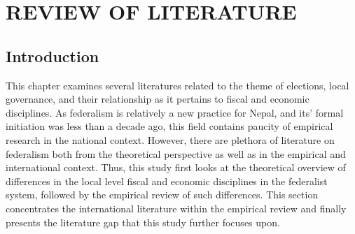 \newpage
\section{REVIEW OF LITERATURE} 
\subsection{Introduction} \vspace{-3mm}
This chapter examines several literatures related to the theme of elections, local governance, and their relationship as it pertains to fiscal and economic disciplines. As federalism is relatively a new practice for Nepal, and its' formal initiation was less than a decade ago, this field contains paucity of empirical research in the national context. However, there are plethora of literature on federalism both from the theoretical perspective as well as in the empirical and international context. Thus, this study first looks at the theoretical overview of differences in the local level fiscal and economic disciplines in the federalist system, followed by the empirical review of such differences. This section concentrates the international literature within the empirical review and finally presents the literature gap that this study further focuses upon. \vspace{-5mm}
